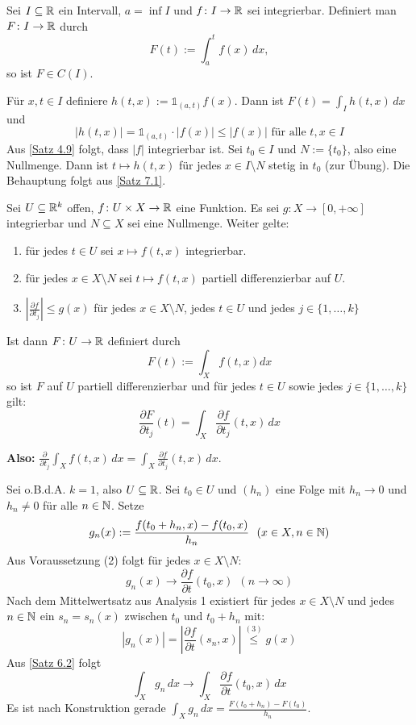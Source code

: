 \documentclass[a4paper,twoside,DIV15,BCOR12mm,chapterprefix=true,headings=onelinechapter]{scrbook}
\begin{document}
\begin{folgerung}
\label{Folgerung 7.2}
Sei \(I\subseteq\mathbb{R}\) ein Intervall, \(a=\inf I\) und \(f\colon I\to\mathbb{R}\) sei integrierbar. Definiert man \(F\colon I\to\mathbb{R}\) durch 
\[F(t):=\int^t_a f(x)\,dx,\] so ist \(F\in C(I)\).
\end{folgerung}

\begin{beweis}
Für \(x,t\in I\) definiere \(h(t,x):=\mathds{1}_{(a,t)}f(x)\). Dann ist \(F(t)=\int_I h(t,x)\,dx\) und 
\[\lvert h(t,x)\rvert = \mathds{1}_{(a,t)}\cdot \lvert f(x)\rvert \leq \lvert f(x)\rvert \text{ für alle } t,x\in I\]
Aus \ref{Satz 4.9} folgt, dass \(\lvert f\rvert\) integrierbar ist. Sei \(t_0\in I\) und \(N:=\{t_0\}\), also eine Nullmenge.
Dann ist \(t\mapsto h(t,x)\) für jedes \(x\in I\setminus N\) stetig in \(t_0\) (zur Übung). Die Behauptung folgt aus \ref{Satz 7.1}.
\end{beweis}

\begin{satz}
\label{Satz 7.3}
Sei \(U\subseteq \mathbb{R}^k\) offen, \(f\colon U\times X\to\mathbb{R}\) eine Funktion. Es sei \(g\colon X\to [0,+\infty]\) integrierbar und \(N\subseteq X\) sei eine Nullmenge.
Weiter gelte:
\begin{enumerate}
	\item 	für jedes \(t\in U\) sei \(x\mapsto f(t,x)\) integrierbar.
	\item 	für jedes \(x\in X\setminus N\) sei \(t\mapsto f(t,x)\) partiell differenzierbar auf $U$.
	\item 	\(\left\lvert \frac{ \partial f}{\partial t_j} \right\rvert \leq g(x) \) für jedes \(x\in X\setminus N\), jedes \(t\in U\) und jedes \(j\in\{1,\ldots,k\}\)
\end{enumerate}
Ist dann \(F\colon U\to\mathbb{R}\) definiert durch \[F(t):=\int_X f(t,x)dx\] so ist $F$ auf $U$ partiell differenzierbar und für jedes \( t\in U\) sowie jedes \( j\in\{1,\ldots,k\}\) gilt:
\[ \frac{\partial F}{\partial t_j}(t) = \int_X\frac{\partial f}{\partial t_j}(t,x)\,dx \]
\end{satz}
\textbf{Also: } \( \frac{\partial}{\partial t_j}\int_X f(t,x)\,dx = \int_X \frac{\partial f}{\partial t_j}(t,x)\,dx \).

\begin{beweis}
Sei o.B.d.A. \(k=1\), also \(U\subseteq\mathbb{R}\). Sei \(t_0\in U\) und \((h_n)\) eine Folge mit \(h_n\to 0\) und \(h_n\neq 0\) für alle \(n\in\mathbb{N}\).
Setze \[g_n(x):=\frac{f(t_0+h_n,x)-f(t_0,x)}{h_n} \ \ (x\in X, \natn) \]
Aus Voraussetzung (2) folgt für jedes \(x\in X\setminus N\): \[ g_n(x)\to \frac{\partial f}{\partial t}(t_0,x) \ \ (n\to\infty) \]
Nach dem Mittelwertsatz aus Analysis 1 existiert für jedes \(x\in X\setminus N\) und jedes \(n\in\mathbb{N}\) ein \(s_n=s_n(x)\) zwischen \(t_0\) und \(t_0+h_n\) mit:
\[ \left\lvert g_n(x) \right\rvert = \left\lvert \frac{\partial f}{\partial t}(s_n,x)\right\rvert \overset{(3)}\leq g(x) \]
Aus \ref{Satz 6.2} folgt \[ \int_X g_n\,dx \longrightarrow \int_X\frac{\partial f}{\partial t}(t_0,x)\,dx \]
Es ist nach Konstruktion  gerade \(\int_X g_n\,dx =\frac{F(t_0+h_n)-F(t_0)}{h_n} \).
\end{beweis}
\end{document}

